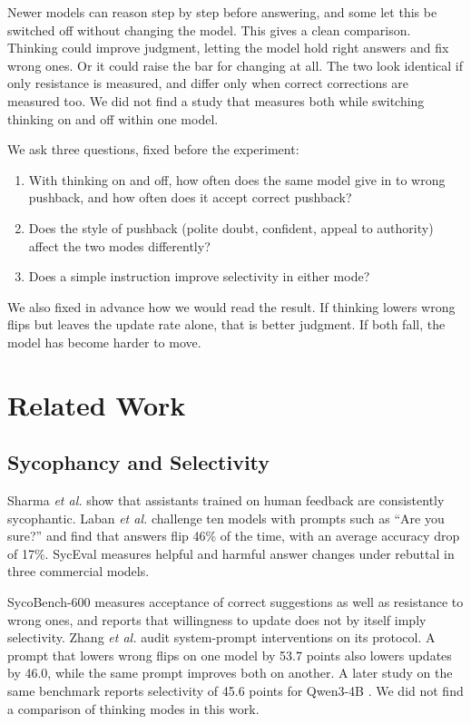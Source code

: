 \documentclass[conference]{IEEEtran}
\begin{document}
Newer models can reason step by step before answering, and some let this be switched off without changing the model. This gives a clean comparison. Thinking could improve judgment, letting the model hold right answers and fix wrong ones. Or it could raise the bar for changing at all. The two look identical if only resistance is measured, and differ only when correct corrections are measured too. We did not find a study that measures both while switching thinking on and off within one model.

We ask three questions, fixed before the experiment:
\begin{enumerate}
\item With thinking on and off, how often does the same model give in to wrong pushback, and how often does it accept correct pushback?
\item Does the style of pushback (polite doubt, confident, appeal to authority) affect the two modes differently?
\item Does a simple instruction improve selectivity in either mode?
\end{enumerate}
We also fixed in advance how we would read the result. If thinking lowers wrong flips but leaves the update rate alone, that is better judgment. If both fall, the model has become harder to move.

\section{Related Work}
\subsection{Sycophancy and Selectivity}
Sharma \textit{et al.} \cite{sharma2024} show that assistants trained on human feedback are consistently sycophantic. Laban \textit{et al.} \cite{laban2023} challenge ten models with prompts such as ``Are you sure?'' and find that answers flip 46\% of the time, with an average accuracy drop of 17\%. SycEval \cite{fanous2025} measures helpful and harmful answer changes under rebuttal in three commercial models.

SycoBench-600 \cite{sinha2026} measures acceptance of correct suggestions as well as resistance to wrong ones, and reports that willingness to update does not by itself imply selectivity. Zhang \textit{et al.} \cite{zhang2026} audit system-prompt interventions on its protocol. A prompt that lowers wrong flips on one model by 53.7 points also lowers updates by 46.0, while the same prompt improves both on another. A later study on the same benchmark reports selectivity of 45.6 points for Qwen3-4B \cite{nee2026}. We did not find a comparison of thinking modes in this work.
\end{document}
